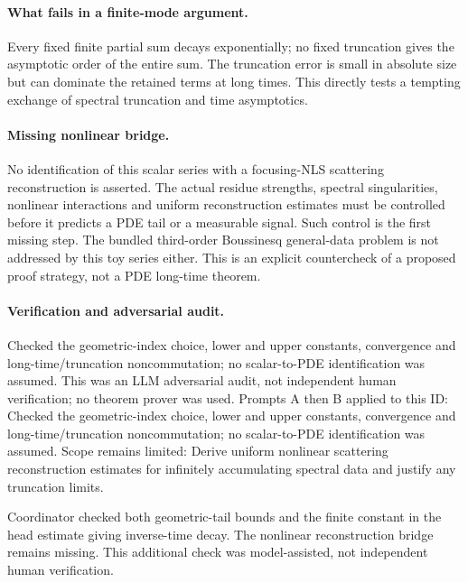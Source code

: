 \documentclass[11pt]{article}
\begin{document}
\paragraph{What fails in a finite-mode argument.}Every fixed finite partial sum decays exponentially; no fixed truncation gives the asymptotic order of the entire sum. The truncation error is small in absolute size but can dominate the retained terms at long times. This directly tests a tempting exchange of spectral truncation and time asymptotics.
\paragraph{Missing nonlinear bridge.}No identification of this scalar series with a focusing-NLS scattering reconstruction is asserted. The actual residue strengths, spectral singularities, nonlinear interactions and uniform reconstruction estimates must be controlled before it predicts a PDE tail or a measurable signal. Such control is the first missing step. The bundled third-order Boussinesq general-data problem is not addressed by this toy series either. This is an explicit countercheck of a proposed proof strategy, not a PDE long-time theorem.

\paragraph{Verification and adversarial audit.}
Checked the geometric-index choice, lower and upper constants, convergence and long-time/truncation noncommutation; no scalar-to-PDE identification was assumed. This was an LLM adversarial audit, not independent human verification; no theorem prover was used. Prompts A then B applied to this ID: Checked the geometric-index choice, lower and upper constants, convergence and long-time/truncation noncommutation; no scalar-to-PDE identification was assumed. Scope remains limited: Derive uniform nonlinear scattering reconstruction estimates for infinitely accumulating spectral data and justify any truncation limits.

Coordinator checked both geometric-tail bounds and the finite constant in the head estimate giving inverse-time decay. The nonlinear reconstruction bridge remains missing. This additional check was model-assisted, not independent human verification.
\end{document}
